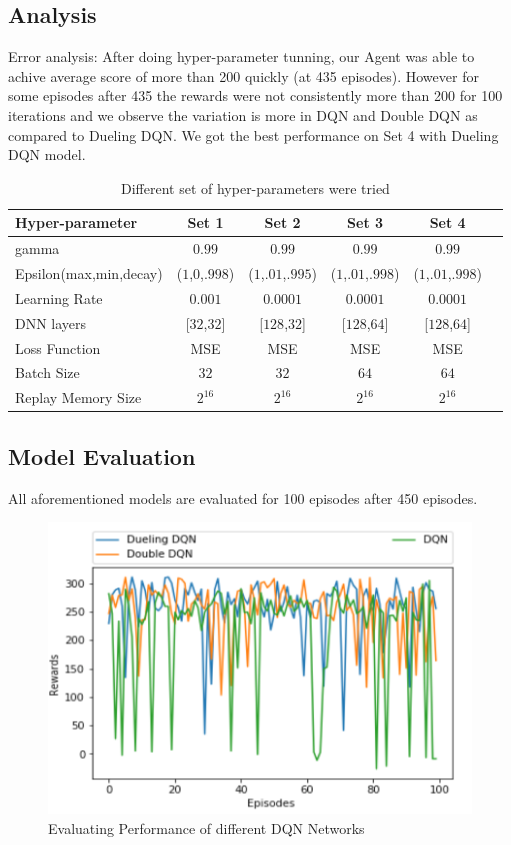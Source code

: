 \subsection{ Analysis}
Error analysis: After doing hyper-parameter tunning, our Agent was able to achive average score of more than 200 quickly (at 435 episodes). 
However for some episodes after 435 the rewards were not consistently more than 200 for 100 iterations and we observe the variation is more in DQN and Double DQN as compared to Dueling DQN. We got the best performance on Set 4 with Dueling DQN model.



\label{sec:exp1}
\begin{table}%
\centering
\begin{tabular}{|l|c|c|c|c|c|}
\hline
Hyper-parameter & Set 1  & Set 2 & Set 3 & Set 4  \\
\hline
gamma & $0.99$ & $0.99$ & $0.99$ & $0.99$ \\
\hline
Epsilon(max,min,decay) & ($1$,$0$,$.998$) &  ($1$,$.01$,$.995$) &  ($1$,$.01$,$.998$) &  ($1$,$.01$,$.998$) \\
\hline
Learning Rate & $0.001$ & $0.0001$ & $0.0001$ & $0.0001$ \\
\hline
DNN layers & [$32$,$32$] &  [$128$,$32$] &  [$128$,$64$] &  [$128$,$64$] \\
\hline
Loss Function & MSE & MSE & MSE & MSE \\
\hline
Batch Size & $32$ & $32$  & $64$  & $64$  \\
\hline
Replay Memory Size & $2^16$ & $2^16$  & $2^16$  & $2^16$  \\
\hline
\end{tabular}
\caption{Different set of hyper-parameters were tried}
\label{tab:accuracy1}
\end{table}



\subsection{ Model Evaluation}

All aforementioned models are evaluated for 100 episodes after 450 episodes. 

\begin{figure}[!ht]
\centering
\includegraphics[scale=0.75,width=0.75\columnwidth]{figures/Picture2.png}%
\caption{ Evaluating Performance of different DQN Networks}%
\label{fig:Visualization}%
\end{figure}


